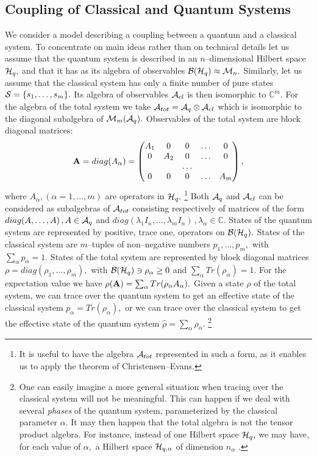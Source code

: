\documentclass[12pt]{article}
\def\complex{{\mathbb C}}
\begin{document}
\subsection{Coupling of Classical and Quantum Systems}
We consider a model describing a coupling between a quantum and
a classical system.  To concentrate on main ideas rather than on
technical details let us assume that the quantum system is described in
an $n$--dimensional Hilbert space ${\cal H}_q , $ and that it has as its
algebra of observables ${\cal B} ({\cal H}_q) \approx {\cal M}_n . $ Similarly, 
let us assume that the classical system has only a finite number of pure
states ${\cal S}=\{ s_1, \ldots , s_m\} . $ Its algebra of observables
${\cal A}_{cl}$ is then isomorphic to $\complex^m . $ For the algebra
of the total system we take
${\cal A}_{tot}={\cal A}_q \otimes {\cal A}_{cl}$ which is isomorphic to the
diagonal subalgebra of ${\cal M}_m  ({\cal A}_q) . $ Observables of the total
system are block diagonal matrices: 
$${\bf A}=diag (A_{\alpha}) = \begin{pmatrix}
A_1&0&0&\ldots&0\cr
0&A_2&0&\ldots&0\cr
&&\ldots&&\cr
0&0&0&\ldots&A_m\cr\end{pmatrix}, $$
where $A_{\alpha},   (\alpha=1, \ldots , m)$ are operators in ${\cal H}_q
. $%
\footnote{It is useful to have the algebra  ${\cal A}_{tot}$
represented in such a form, as it enables us to apply the
theorem of Christensen--Evans.}
Both ${\cal A}_q$ and ${\cal A}_{cl}$ can be considered as
subalgebras  of ${\cal A}_{tot}$ consisting respectively of matrices
of the form
$diag (A, \ldots, A)\,  ,  A\in {\cal A}_q$ and $diag (\lambda_1
I_n, \ldots, \lambda_m I_n)\,  ,  \lambda_{\alpha}\in\complex . $ 
States of the quantum system are represented by positive,  trace one,  
operators on
${\cal B} ({\cal H}_q) . $ States of the classical system are
$m$--tuples of non--negative numbers $p_1, \ldots, p_m , $  with
$\sum_{\alpha} p_{\alpha}=1. $ States of the total system are
represented by block diagonal matrices
$ \rho =diag (\rho_1, \ldots, \rho_m) , $ with ${\cal B} ({\cal
H}_q)\ni \rho_{\alpha}\geq 0$ and $\sum_{\alpha} Tr (\rho_{\alpha})=1
. $ For the expectation value we have  $\rho  ({\bf A}) =\sum_{\alpha}
Tr (\rho_\alpha A_\alpha ) . $ Given a state $\rho$ of the total
system,  we can trace over the quantum system to get an effective state
of the classical system
$p_\alpha =Tr (\rho_\alpha ) ,  $ or we can trace over the classical
system to get the effective state of the quantum system
${\hat\rho}=\sum_\alpha\rho_\alpha . $%
\footnote{One can easily imagine a more general situation when
tracing over the classical system will not be meaningful.  This can
happen if we deal with several {\em phases} of the quantum system, 
parameterized by the classical parameter $\alpha$.  It may then happen
that the total algebra is not the  tensor product algebra.  For
instance,  instead of one Hilbert space ${\cal H}_q , $ we may have, 
for each value of $\alpha , $ a Hilbert space ${\cal H}_{q, \alpha}$ 
of dimension $n_\alpha$ . }
\end{document}
